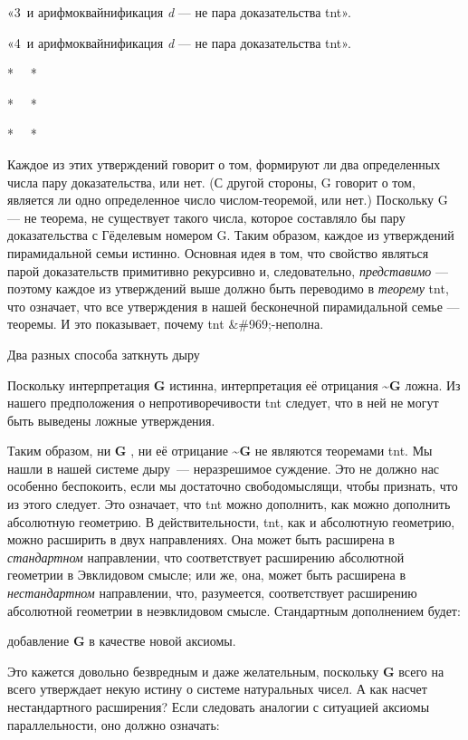 \documentclass[../main.tex]{subfiles}
\begin{document}
«3~и арифмоквайнификация \emph{d} --- не пара доказательства \acs{tnt}».

«4~и арифмоквайнификация \emph{d} --- не пара доказательства \acs{tnt}».

*~~ *

*~~ *

*~~ *

Каждое из этих утверждений говорит о том, формируют ли два определенных числа пару доказательства, или нет. (С другой стороны, G говорит о том, является ли одно определенное число числом-теоремой, или нет.) Поскольку G --- не теорема, не существует такого числа, которое составляло бы пару доказательства с Гёделевым номером G. Таким образом, каждое из утверждений пирамидальной семьи истинно. Основная идея в том, что свойство являться парой доказательств примитивно рекурсивно и, следовательно, \emph{представимо} --- поэтому каждое из утверждений выше должно быть переводимо в \emph{теорему} \acs{tnt}, что означает, что все утверждения в нашей бесконечной пирамидальной семье --- теоремы. И это показывает, почему \acs{tnt} \&\#969;-неполна.

Два разных способа заткнуть дыру

Поскольку интерпретация \textbf{G} истинна, интерпретация её отрицания \textbf{\textasciitilde G} ложна. Из нашего предположения о непротиворечивости \acs{tnt} следует, что в ней не могут быть выведены ложные утверждения.

Таким образом, ни \textbf{G} , ни её отрицание \textbf{\textasciitilde G} не являются теоремами \acs{tnt}\@. Мы нашли в нашей системе дыру~--- неразрешимое суждение. Это не должно нас особенно беспокоить, если мы достаточно свободомыслящи, чтобы признать, что из этого следует. Это означает, что \acs{tnt} можно дополнить, как можно дополнить абсолютную геометрию. В действительности, \acs{tnt}, как и абсолютную геометрию, можно расширить в двух направлениях. Она может быть расширена в \emph{стандартном} направлении, что соответствует расширению абсолютной геометрии в Эвклидовом смысле; или же, она, может быть расширена в \emph{нестандартном} направлении, что, разумеется, соответствует расширению абсолютной геометрии в неэвклидовом смысле. Стандартным дополнением будет:

добавление \textbf{G} в качестве новой аксиомы.

Это кажется довольно безвредным и даже желательным, поскольку \textbf{G} всего на всего утверждает некую истину о системе натуральных чисел. А как насчет нестандартного расширения? Если следовать аналогии с ситуацией аксиомы параллельности, оно должно означать:
\end{document}
